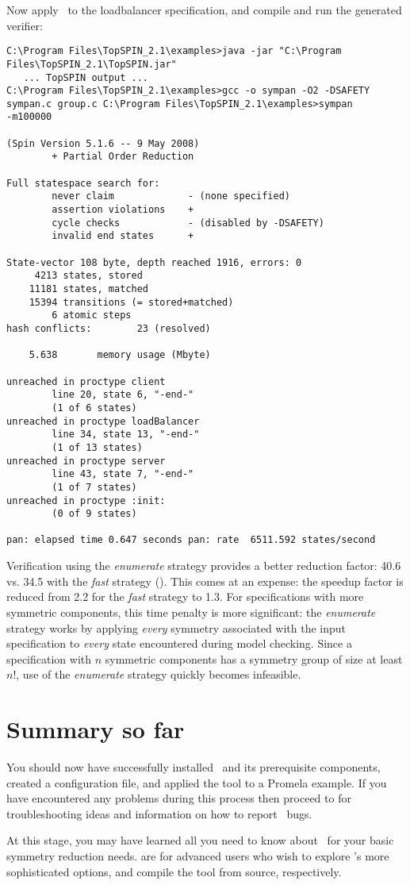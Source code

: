 Now apply \topspin\ to the loadbalancer specification, and compile
and run the generated verifier:
%
\begin{lstlisting}
C:\Program Files\TopSPIN_2.1\examples>java -jar "C:\Program
Files\TopSPIN_2.1\TopSPIN.jar"
   ... TopSPIN output ...
C:\Program Files\TopSPIN_2.1\examples>gcc -o sympan -O2 -DSAFETY
sympan.c group.c C:\Program Files\TopSPIN_2.1\examples>sympan
-m100000

(Spin Version 5.1.6 -- 9 May 2008)
        + Partial Order Reduction

Full statespace search for:
        never claim             - (none specified)
        assertion violations    +
        cycle checks            - (disabled by -DSAFETY)
        invalid end states      +

State-vector 108 byte, depth reached 1916, errors: 0
     4213 states, stored
    11181 states, matched
    15394 transitions (= stored+matched)
        6 atomic steps
hash conflicts:        23 (resolved)

    5.638       memory usage (Mbyte)

unreached in proctype client
        line 20, state 6, "-end-"
        (1 of 6 states)
unreached in proctype loadBalancer
        line 34, state 13, "-end-"
        (1 of 13 states)
unreached in proctype server
        line 43, state 7, "-end-"
        (1 of 7 states)
unreached in proctype :init:
        (0 of 9 states)

pan: elapsed time 0.647 seconds pan: rate  6511.592 states/second
\end{lstlisting}
%
Verification using the \emph{enumerate} strategy provides a better
reduction factor: 40.6 vs. 34.5 with the \emph{fast} strategy
(). This comes at an expense: the speedup
factor is reduced from 2.2 for the \emph{fast} strategy to 1.3.  For
specifications with more symmetric components, this time penalty is
more significant: the \emph{enumerate} strategy works by applying
\emph{every} symmetry associated with the input specification to
\emph{every} state encountered during model checking.  Since a
specification with $n$ symmetric components has a symmetry group of
size at least $n!$, use of the \emph{enumerate} strategy quickly
becomes infeasible.

\section{Summary so far}
%
You should now have successfully installed \topspin\ and its
prerequisite components, created a configuration file, and applied
the tool to a Promela example.  If you have encountered any problems
during this process then proceed to  for
troubleshooting ideas and information on how to report \topspin\
bugs.

At this stage, you may have learned all you need to know about
\topspin\ for your basic symmetry reduction needs.
 are for advanced users who
wish to explore \topspin's more sophisticated options, and compile
the tool from source, respectively.

